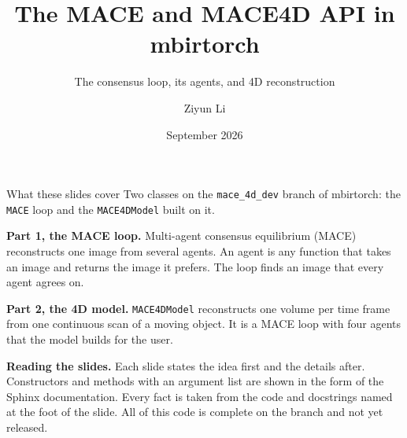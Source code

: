 \documentclass[aspectratio=169,10pt]{beamer}
\title{The MACE and MACE4D API in mbirtorch}
\subtitle{The consensus loop, its agents, and 4D reconstruction}
\author{Ziyun Li}
\date{September 2026}
\newcommand{\head}[1]{\textbf{#1}}
\begin{document}
\maketitle

\begin{frame}{What these slides cover}
  \medskip
  {\large Two classes on the \texttt{mace\_4d\_dev} branch of mbirtorch:
  the \texttt{MACE} loop and the \texttt{MACE4DModel} built on it.}\par\vspace{8pt}
  {\small
  \head{Part 1, the MACE loop.}  Multi-agent consensus equilibrium (MACE)
  reconstructs one image from several agents.  An agent is any function
  that takes an image and returns the image it prefers.  The loop finds an
  image that every agent agrees on.\par\vspace{6pt}
  \head{Part 2, the 4D model.}  \texttt{MACE4DModel} reconstructs one
  volume per time frame from one continuous scan of a moving object.  It
  is a MACE loop with four agents that the model builds for the
  user.\par\vspace{6pt}
  \head{Reading the slides.}  Each slide states the idea first and the
  details after.  Constructors and methods with an argument list are shown
  in the form of the Sphinx documentation.  Every fact is taken from the
  code and docstrings named at the foot of the slide.  All of this code is
  complete on the branch and not yet released.}
\end{frame}
\end{document}
